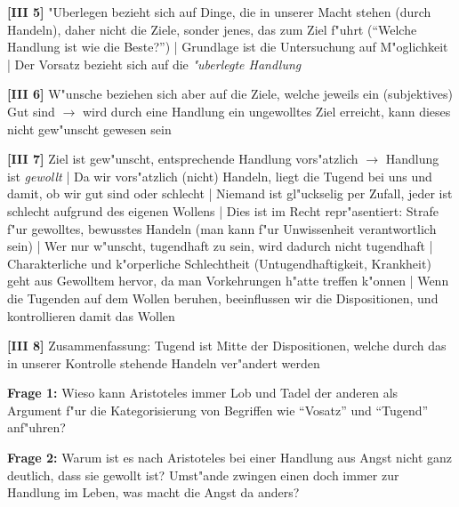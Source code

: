 \documentclass[a4paper]{article}
\begin{document}
\noindent \textbf{[III 5]} "Uberlegen bezieht sich auf Dinge, die in unserer Macht stehen (durch Handeln), daher nicht die Ziele, sonder jenes, das zum Ziel f"uhrt ("`Welche Handlung ist wie die Beste?"') | Grundlage ist die Untersuchung auf M"oglichkeit | Der Vorsatz bezieht sich auf die \emph{"uberlegte Handlung}\newline

\noindent \textbf{[III 6]} W"unsche beziehen sich aber auf die Ziele, welche jeweils ein (subjektives) Gut sind $\rightarrow$ wird durch eine Handlung ein ungewolltes Ziel erreicht, kann dieses nicht gew"unscht gewesen sein \newline

\noindent \textbf{[III 7]} Ziel ist gew"unscht, entsprechende Handlung vors"atzlich $\rightarrow$ Handlung ist \emph{gewollt} | Da wir vors"atzlich (nicht) Handeln, liegt die Tugend bei uns und damit, ob wir gut sind oder schlecht | Niemand ist gl"uckselig per Zufall, jeder ist schlecht aufgrund des eigenen Wollens | Dies ist im Recht repr"asentiert: Strafe f"ur gewolltes, bewusstes Handeln (man kann f"ur Unwissenheit verantwortlich sein) | Wer nur w"unscht, tugendhaft zu sein, wird dadurch nicht tugendhaft | Charakterliche und k"orperliche Schlechtheit (Untugendhaftigkeit, Krankheit) geht aus Gewolltem hervor, da man Vorkehrungen h"atte treffen k"onnen | Wenn die Tugenden auf dem Wollen beruhen, beeinflussen wir die Dispositionen, und kontrollieren damit das Wollen\newline

\noindent \textbf{[III 8]} Zusammenfassung: Tugend ist Mitte der Dispositionen, welche durch das in unserer Kontrolle stehende Handeln ver"andert werden\newline


\noindent \textbf{Frage 1:} Wieso kann Aristoteles immer Lob und Tadel der anderen als Argument f"ur die Kategorisierung von Begriffen wie "`Vosatz"' und "`Tugend"' anf"uhren? \newline

\noindent \textbf{Frage 2:} Warum ist es nach Aristoteles bei einer Handlung aus Angst nicht ganz deutlich, dass sie gewollt ist? Umst"ande zwingen einen doch immer zur Handlung im Leben, was macht die Angst da anders? 
\end{document}
